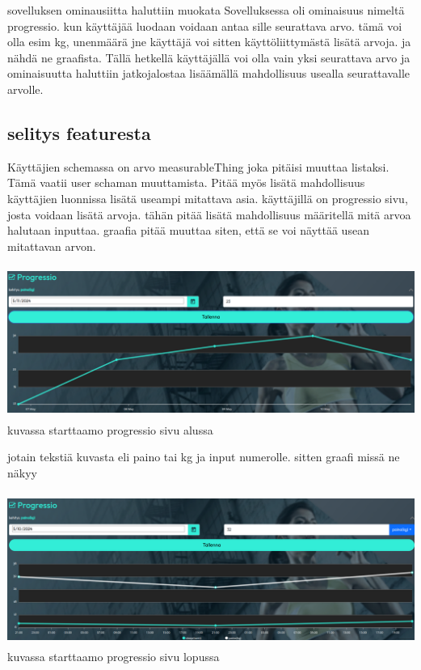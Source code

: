 
sovelluksen ominausiitta haluttiin muokata
Sovelluksessa oli ominaisuus nimeltä progressio. kun käyttäjää luodaan voidaan antaa sille seurattava arvo. tämä voi olla esim kg, unenmäärä jne
käyttäjä voi sitten käyttöliittymästä lisätä arvoja. ja nähdä ne graafista. 
Tällä hetkellä käyttäjällä voi olla vain yksi seurattava arvo ja ominaisuutta haluttiin jatkojalostaa lisäämällä mahdollisuus usealla seurattavalle arvolle. 


\subsection*{selitys featuresta}

Käyttäjien schemassa on arvo measurableThing joka pitäisi muuttaa listaksi. Tämä vaatii user schaman muuttamista.
Pitää myös lisätä mahdollisuus käyttäjien luonnissa lisätä useampi mitattava asia.
käyttäjillä on progressio sivu, josta voidaan lisätä arvoja.
tähän pitää lisätä mahdollisuus määritellä mitä arvoa halutaan inputtaa.
graafia pitää muuttaa siten, että se voi näyttää usean mitattavan arvon.
\medskip


\includegraphics[width= 15cm, height=5cm]{src/public/progressiosingle.png} \\
kuvassa starttaamo progressio sivu alussa
\medskip

jotain tekstiä kuvasta 
eli paino tai kg ja input numerolle.
sitten graafi missä ne näkyy
\medskip


\includegraphics[width= 15cm, height=5cm]{src/public/progressmulti.png} \\
kuvassa starttaamo progressio sivu lopussa
\medskip


